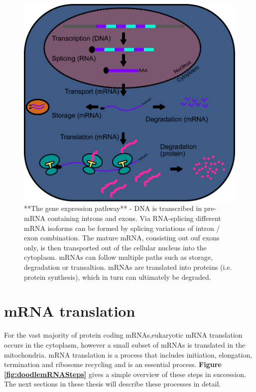 \documentclass[
  12pt,
  openany]{book}
\begin{document}
\begin{figure}
  \includegraphics{./figures/GeneExprPath.pdf}
  \caption{**The gene expression pathway** - DNA is transcribed in pre-mRNA containing introns and exons. Via RNA-splicing different mRNA isoforms can be formed by splicing variations of intron / exon combination. The mature mRNA, consisting out ouf exons only, is then transported out of the cellular nucleus into the cytoplasm. mRNAs can follow multiple paths such as storage, degradation or transaltion. mRNAs are translated into proteins (i.e. protein synthesis), which in turn can ultimately be degraded. \label{fig:geneExprPath}}
\end{figure}

\section{mRNA translation}

For the vast majority of protein coding mRNAs,eukaryotic mRNA translation occurs in the cytoplasm, however a small subset of mRNAs is translated in the mitochondria. mRNA translation is a process that includes initiation, elongation, termination and ribosome recycling and is an essential process. \textbf{Figure \ref{fig:doodlemRNASteps}} gives a simple overview of these steps in succession. The next sections in these thesis will describe these processes in detail.
\end{document}
